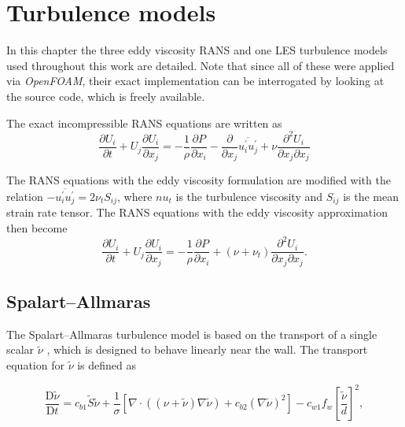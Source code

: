 \chapter{Turbulence models}
\doublespace

In this chapter the three eddy viscosity RANS and one LES turbulence models used
throughout this work are detailed. Note that since all of these were applied via
\textit{OpenFOAM}, their exact implementation can be interrogated by looking at
the source code, which is freely available.

The exact incompressible RANS equations are written as
\begin{equation}
    \frac{\partial U_i}{\partial t}
    + U_j \frac{\partial U_i}{\partial x_j}
    =
    -\frac{1}{\rho}\frac{\partial P}{\partial x_i}
    - \frac{\partial}{\partial x_j} \overline{u_i^\prime u_j^\prime}
    + \nu \frac{\partial^2 U_i}{\partial x_j \partial x_j}
\end{equation}

The RANS equations with the eddy viscosity formulation are modified with the
relation $-\overline{u_i^\prime u_j^\prime} = 2 \nu_t S_{ij}$, where $nu_t$ is
the turbulence viscosity and $S_{ij}$ is the mean strain rate tensor. The RANS
equations with the eddy viscosity approximation then become
\begin{equation}
    \frac{\partial U_i}{\partial t}
    + U_j \frac{\partial U_i}{\partial x_j}
    =
    -\frac{1}{\rho}\frac{\partial P}{\partial x_i}
    + (\nu + \nu_t) \frac{\partial^2 U_i}{\partial x_j \partial x_j}.
\end{equation}


\section{Spalart--Allmaras}

The Spalart--Allmaras turbulence model is based on the transport of a single
scalar $\tilde{\nu}$ \cite{Spalart1992}, which is designed to behave linearly
near the wall. The transport equation for $\tilde{\nu}$ is defined as

\begin{equation}
    \frac{\mathrm{D} \tilde{\nu}}{\mathrm{D} t}
    = c_{b1} \tilde{S} \tilde{\nu}
    + \frac{1}{\sigma}
    \left[
    \nabla \cdot \left( (\nu + \tilde{\nu}) \nabla \tilde{\nu} \right)
    + c_{b2} (\nabla \tilde{\nu})^2
    \right]
    - c_{w1} f_w \left[ \frac{\tilde{\nu}}{d} \right]^2,
    \label{eq:SA-nutilde}
\end{equation}

